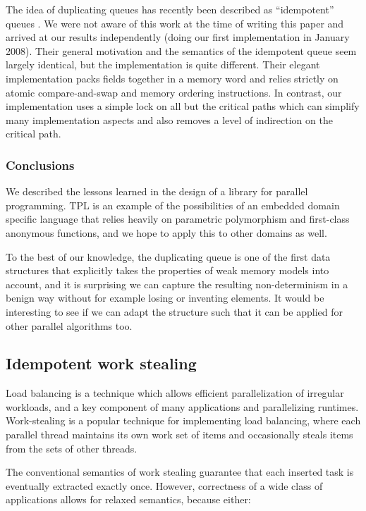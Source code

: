 The idea of duplicating queues has recently been described as
``idempotent'' queues \cite{Michael2009}. We were not aware of this
work at the time of writing this paper and arrived at our results
independently (doing our first implementation in January 2008). Their
general motivation and the semantics of the idempotent queue seem
largely identical, but the implementation is quite different. Their
elegant implementation packs fields together in a memory word and
relies strictly on atomic compare-and-swap and memory ordering
instructions. In contrast, our implementation uses a simple lock on
all but the critical paths which can simplify many implementation
aspects and also removes a level of indirection on the critical path.

\subsubsection{Conclusions}

We described the lessons learned in the design of a library for
parallel programming. TPL is an example of the possibilities of an
embedded domain specific language that relies heavily on parametric
polymorphism and first-class anonymous functions, and we hope to apply
this to other domains as well.

To the best of our knowledge, the duplicating queue is one of the
first data structures that explicitly takes the properties of weak
memory models into account, and it is surprising we can capture the
resulting non-determinism in a benign way without for example losing
or inventing elements. It would be interesting to see if we can adapt
the structure such that it can be applied for other parallel
algorithms too.


\subsection{Idempotent work stealing \cite{Michael2009}}

Load balancing is a technique which allows efficient parallelization
of irregular workloads, and a key component of many applications and
parallelizing runtimes. Work-stealing is a popular technique for
implementing load balancing, where each parallel thread maintains its
own work set of items and occasionally steals items from the sets of
other threads.

The conventional semantics of work stealing guarantee that each
inserted task is eventually extracted exactly once. However,
correctness of a wide class of applications allows for relaxed
semantics, because either:

